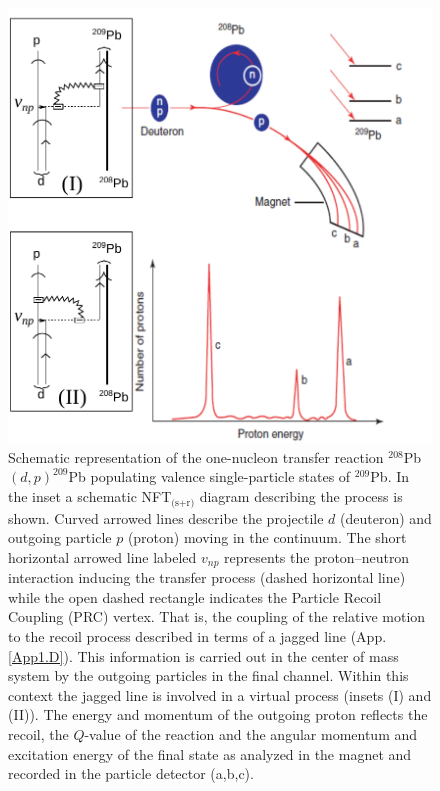 \begin{figure}[h!]
\centerline {
\includegraphics*[width=12cm]{introduccion/figs/figintro2}
}
\caption{Schematic  representation of the one-nucleon transfer reaction $^{208}$Pb$(d,p)^{209}$Pb populating  valence single-particle states of $^{209}$Pb. In the inset a schematic NFT$_{\text{(s+r)}}$ diagram describing the process is shown. Curved arrowed lines describe the projectile $d$ (deuteron) and outgoing particle $p$ (proton) moving in the continuum. The short horizontal arrowed line labeled $v_{np}$ represents the proton--neutron interaction inducing the transfer process (dashed horizontal line) while the  open dashed rectangle indicates the Particle Recoil Coupling (PRC) vertex. That is,  the coupling of the relative motion to the recoil process described in terms of a jagged line (App. \ref{App1.D}). This information is carried out in the center of mass system by the outgoing particles in the final channel. Within this context the jagged line is involved in a virtual process (insets (I) and (II)). The energy and momentum of the outgoing proton reflects the recoil, the  $Q$-value of the reaction and the angular momentum and excitation energy of the final state as analyzed in the magnet and recorded in the particle detector (a,b,c).}
\label{figintro2}
\end{figure}
